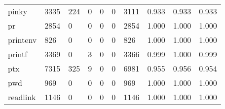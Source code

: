\begin{longtable}{lp{2.0cm}p{2.0cm}p{2.0cm}p{2.0cm}p{2.0cm}p{2.0cm}p{2.0cm}p{2.0cm}p{2.0cm}}
pinky     &                   3335 &                                224 &                                 0 &                                0 &                                 0 &                            3111 &                                   0.933 &                                  0.933 &                                0.933 \\
pr        &                   2854 &                                  0 &                                 0 &                                0 &                                 0 &                            2854 &                                   1.000 &                                  1.000 &                                1.000 \\
printenv  &                    826 &                                  0 &                                 0 &                                0 &                                 0 &                             826 &                                   1.000 &                                  1.000 &                                1.000 \\
printf    &                   3369 &                                  0 &                                 3 &                                0 &                                 0 &                            3366 &                                   0.999 &                                  1.000 &                                0.999 \\
ptx       &                   7315 &                                325 &                                 9 &                                0 &                                 0 &                            6981 &                                   0.955 &                                  0.956 &                                0.954 \\
pwd       &                    969 &                                  0 &                                 0 &                                0 &                                 0 &                             969 &                                   1.000 &                                  1.000 &                                1.000 \\
readlink  &                   1146 &                                  0 &                                 0 &                                0 &                                 0 &                            1146 &                                   1.000 &                                  1.000 &                                1.000 \\

\end{longtable}
